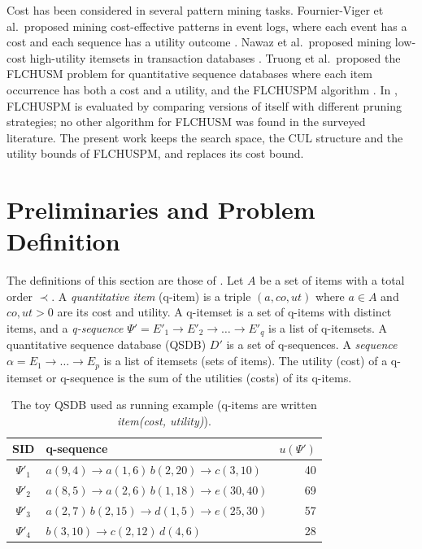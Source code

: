 \documentclass[pdflatex,sn-mathphys,Numbered]{sn-jnl}
\theoremstyle{thmstyleone}
\theoremstyle{thmstyletwo}
\theoremstyle{thmstylethree}
\newcommand{\FL}{\textsc{FLCHUSPM}}
\begin{document}
Cost has been considered in several pattern mining tasks. Fournier-Viger et al.\ proposed
mining cost-effective patterns in event logs, where each event has a cost and each sequence has
a utility outcome \cite{fournier2020cost}. Nawaz et al.\ proposed mining low-cost high-utility
itemsets in transaction databases \cite{nawaz2022lcim}. Truong et al.\ proposed the FLCHUSM
problem for quantitative sequence databases where each item occurrence has both a cost and a
utility, and the \FL{} algorithm \cite{truong2022}. In \cite{truong2022}, \FL{} is evaluated by
comparing versions of itself with different pruning strategies; no other algorithm for FLCHUSM
was found in the surveyed literature. The present work keeps the search space, the CUL structure
and the utility bounds of \FL{}, and replaces its cost bound.

\section{Preliminaries and Problem Definition}\label{sec:prelim}

The definitions of this section are those of \cite{truong2022}. Let $A$ be a set of items with
a total order $\prec$. A \emph{quantitative item} (q-item) is a triple $(a, co, ut)$ where
$a \in A$ and $co, ut > 0$ are its cost and utility. A q-itemset is a set of q-items with
distinct items, and a \emph{q-sequence} $\Psi' = E'_1 \to E'_2 \to \dots \to E'_q$ is a list of
q-itemsets. A quantitative sequence database (QSDB) $D'$ is a set of q-sequences. A
\emph{sequence} $\alpha = E_1 \to \dots \to E_p$ is a list of itemsets (sets of items). The
utility (cost) of a q-itemset or q-sequence is the sum of the utilities (costs) of its q-items.

\begin{table}[t]
\centering
\caption{The toy QSDB used as running example (q-items are written \emph{item(cost, utility)}).}
\label{tab:toy}
\begin{tabular}{@{}cl r@{}}
\toprule
SID & q-sequence & $u(\Psi')$ \\
\midrule
$\Psi'_1$ & $a(9,4) \to a(1,6)\,b(2,20) \to c(3,10)$ & 40 \\
$\Psi'_2$ & $a(8,5) \to a(2,6)\,b(1,18) \to e(30,40)$ & 69 \\
$\Psi'_3$ & $a(2,7)\,b(2,15) \to d(1,5) \to e(25,30)$ & 57 \\
$\Psi'_4$ & $b(3,10) \to c(2,12)\,d(4,6)$ & 28 \\
\bottomrule
\end{tabular}
\end{table}
\end{document}

